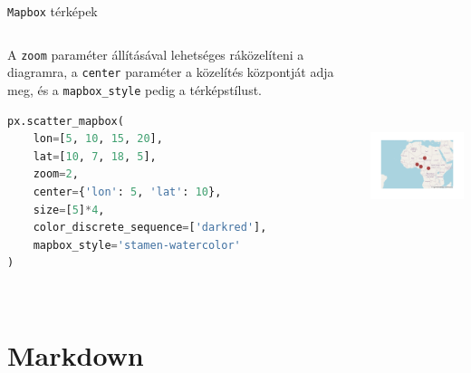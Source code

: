 \documentclass[english, aspectratio=169]{beamer}
\makeatletter
\let\origtableofcontents=\tableofcontents
\def\tableofcontents{\@ifnextchar[{\origtableofcontents}{\gobbletableofcontents}}
\def\gobbletableofcontents#1{\origtableofcontents}
\makeatother
\begin{document}
	\begin{frame}[fragile]{\texttt{Mapbox} térképek}
		\begin{columns}
			\begin{column}{.5\textwidth}
				A \texttt{zoom} paraméter állításával lehetséges ráközelíteni a diagramra, a \texttt{center} paraméter a közelítés központját adja meg, és a \texttt{mapbox\_style} pedig a térképstílust.\par\medskip
				\begin{lstlisting}[language=python]
px.scatter_mapbox(
	lon=[5, 10, 15, 20],
	lat=[10, 7, 18, 5],
	zoom=2,
	center={'lon': 5, 'lat': 10},
	size=[5]*4,
	color_discrete_sequence=['darkred'],
	mapbox_style='stamen-watercolor'
)				
				\end{lstlisting}
			\end{column}
			\begin{column}{.5\textwidth}
				\begin{center}
					\includegraphics[width=7cm, height=7cm, keepaspectratio]{images/scatter_30.png}
				\end{center}
			\end{column}
		\end{columns}
	\end{frame}
	
	\section{Markdown}
	
	\begin{frame}{}
		\tableofcontents[currentsection]
	\end{frame}
	
	
\end{document}
